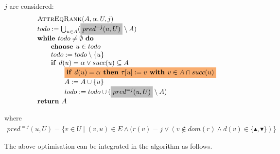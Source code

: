\documentclass{article}
\newcommand{\If}{\text{\textbf{if }}}
\newcommand{\Do}{\text{\textbf{ do }}}
\newcommand{\Then}{\text{\textbf{ then }}}
\newcommand{\While}{\text{\textbf{while }}}
\newcommand{\Return}{\text{\textbf{return }}}
\newcommand{\With}{\text{\textbf{ with }}}
\begin{document}
$j$ are considered:
\begin{equation*}
\begin{array}{l}
\text{\textsc{AttrEqRank}}(A, \alpha, U, j) \\
todo := \bigcup_{u \in A} (%
\colorbox{lightgray}{$ pred^{= j}(u, U) $}%
\setminus A) \\
\While todo \neq \emptyset \Do \\
\qquad \textbf{choose } u \in todo \\
\qquad todo := todo \setminus \{u\} \\
\qquad \If d(u) = \alpha \vee succ(u) \subseteq A \\
\qquad \qquad \colorbox{Apricot}{$ \If d(u) = \alpha \Then \tau
\lbrack u]:=v\With v\in A\cap succ(u) $}\\ 
\qquad \qquad A := A \cup \{u \} \\
\qquad \qquad todo := todo \cup (%
\colorbox{lightgray}{$ pred^{= j}(u, U) $}%
\setminus A)  \\
\Return A
\end{array}
\end{equation*}

where
\begin{eqnarray*}
pred^{= j}(u, U) = \{v \in U \mid (v,u) \in E \wedge (r(v) = j \vee (v \notin dom(r) \wedge d(v) \in \{\blacktriangle,\blacktriangledown\}) \}
\end{eqnarray*}%

The above optimisation can be integrated in the algorithm as follows.
\end{document}

